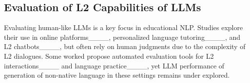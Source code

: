 \subsection{Evaluation of L2 Capabilities of LLMs} 
Evaluating human-like LLMs is a key focus in educational NLP. Studies explore their use in online platforms____, personalized language tutoring____, and L2 chatbots____, but often rely on human judgments due to the complexity of L2 dialogues. Some worked propose automated evaluation tools for L2 interactions____ and language practice____, yet LLM performance of generation of non-native language in these settings remains under explored.


